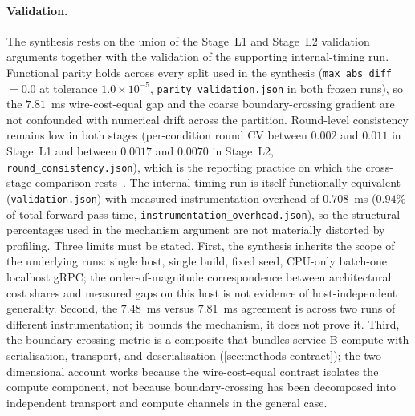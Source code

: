 \paragraph{Validation.}
The synthesis rests on the union of the Stage~L1 and Stage~L2 validation
arguments together with the validation of the supporting
internal-timing run. Functional parity holds across every split used
in the synthesis (\texttt{max\_abs\_diff} \(=0.0\) at tolerance
\(1.0\times 10^{-5}\), \texttt{parity\_validation.json} in both
frozen runs), so the \(7.81\)~ms wire-cost-equal gap and the coarse
boundary-crossing gradient are not confounded with numerical drift
across the partition. Round-level consistency remains low in both
stages (per-condition round CV between \(0.002\) and \(0.011\) in
Stage~L1 and between \(0.0017\) and \(0.0070\) in Stage~L2,
\texttt{round\_consistency.json}), which is the reporting practice on
which the cross-stage comparison rests~\cite{benchmarking_sc15}. The
internal-timing run is itself functionally equivalent
(\texttt{validation.json}) with measured instrumentation overhead of
\(0.708\)~ms (\(0.94\%\) of total forward-pass time,
\texttt{instrumentation\_overhead.json}), so the structural
percentages used in the mechanism argument are not materially
distorted by profiling. Three limits must be stated. First, the
synthesis inherits the scope of the underlying runs: single host,
single build, fixed seed, CPU-only batch-one localhost gRPC; the
order-of-magnitude correspondence between architectural cost shares
and measured gaps on this host is not evidence of host-independent
generality. Second, the \(7.48\)~ms versus \(7.81\)~ms agreement is
across two runs of different instrumentation; it bounds the
mechanism, it does not prove it. Third, the boundary-crossing metric
is a composite that bundles service-B compute with serialisation,
transport, and deserialisation (\cref{sec:methods-contract}); the
two-dimensional account works because the wire-cost-equal contrast
isolates the compute component, not because boundary-crossing has
been decomposed into independent transport and compute channels in
the general case.

